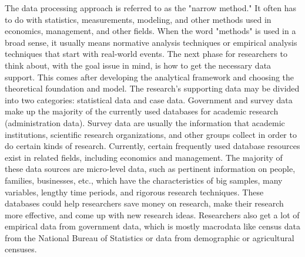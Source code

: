 \documentclass[journal]{IEEEtran}
\begin{document}
\par The data processing approach is referred to as the "narrow method." It often has to do with statistics, measurements, modeling, and other methods used in economics, management, and other fields. When the word "methods" is used in a broad sense, it usually means normative analysis techniques or empirical analysis techniques that start with real-world events. The next phase for researchers to think about, with the goal issue in mind, is how to get the necessary data support. This comes after developing the analytical framework and choosing the theoretical foundation and model. The research's supporting data may be divided into two categories: statistical data and case data. Government and survey data make up the majority of the currently used databases for academic research (administration data). Survey data are usually the information that academic institutions, scientific research organizations, and other groups collect in order to do certain kinds of research. Currently, certain frequently used database resources exist in related fields, including economics and management. The majority of these data sources are micro-level data, such as pertinent information on people, families, businesses, etc., which have the characteristics of big samples, many variables, lengthy time periods, and rigorous research techniques. These databases could help researchers save money on research, make their research more effective, and come up with new research ideas. Researchers also get a lot of empirical data from government data, which is mostly macrodata like census data from the National Bureau of Statistics or data from demographic or agricultural censuses.
\end{document}
